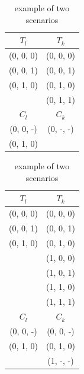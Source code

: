 \documentclass{sig-alternate}
\begin{document}
%

\begin{table}
\centering
\caption{example of two scenarios}
\label{example_three_condition}
  \begin{tabular}{cc}
$T_{l}$&$T_{k}$ \\ \hline
(0, 0, 0)&(0, 0, 0)\\
(0, 0, 1)&(0, 0, 1) \\
(0, 1, 0)&(0, 1, 0)\\
         &(0, 1, 1) \\ \hline
 $C_{l}$&$C_{k}$ \\ \hline
(0, 0, -)&(0, -, -)\\
(0, 1, 0)&		   \\ \hline
  \end{tabular}
  \hspace{1em}
  \begin{tabular}{cc}
$T_{l}$&$T_{k}$\\ \hline
(0, 0, 0) & (0, 0, 0)\\
(0, 0, 1) & (0, 0, 1)\\
(0, 1, 0) & (0, 1, 0)\\
		  & (1, 0, 0)\\
		  & (1, 0, 1)\\
		  & (1, 1, 0)\\
		  & (1, 1, 1)\\ \hline
$C_{l}$&$C_{k}$ \\ \hline
(0, 0, -)&  (0, 0, -)\\
(0, 1, 0)&  (0, 1, 0)\\
		 &  (1, -, -)\\  \hline
  \end{tabular}
  \end{table}
\end{document}
